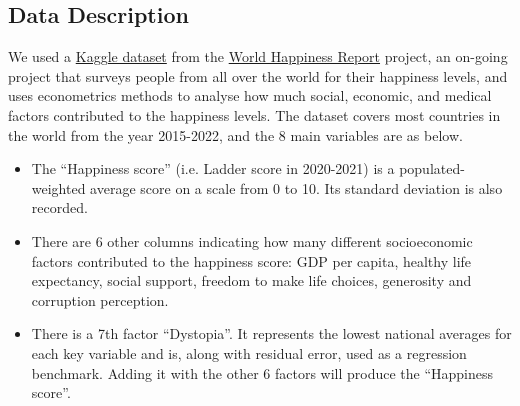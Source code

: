 \documentclass{article}
\begin{document}
\subsection{Data Description}

We used a \href{https://www.kaggle.com/datasets/mathurinache/world-happiness-report}{Kaggle dataset} from the \href{https://worldhappiness.report/ed/2020/#appendices-and-data}{World Happiness Report} project, an on-going project that surveys people from all over the world for their happiness levels, and uses econometrics methods to analyse how much social, economic, and medical factors contributed to the happiness levels. The dataset covers most countries in the world from the year 2015-2022, and the 8 main variables are as below.

\begin{itemize}
    \item The “Happiness score” (i.e. Ladder score in 2020-2021) is a populated-weighted average score on a scale from 0 to 10. Its standard deviation is also recorded.
    \item There are 6 other columns indicating how many different socioeconomic factors contributed to the happiness score: GDP per capita, healthy life expectancy, social support, freedom to make life choices, generosity and corruption perception.
    \item There is a 7th factor “Dystopia”. It represents the lowest national averages for each key variable and is, along with residual error, used as a regression benchmark. Adding it with the other 6 factors will produce the “Happiness score”. 
\end{itemize}
\end{document}
